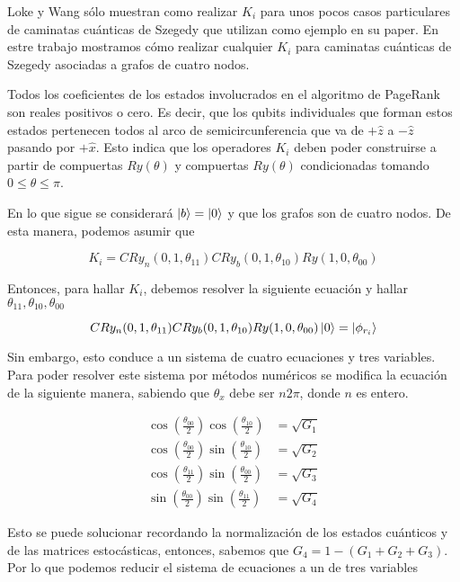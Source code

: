 Loke y Wang sólo muestran como realizar $K_i$ para unos pocos casos particulares de caminatas cuánticas de Szegedy que utilizan como ejemplo en su paper. En estre trabajo mostramos cómo realizar cualquier $K_i$ para caminatas cuánticas de Szegedy asociadas a grafos de cuatro nodos.

Todos los coeficientes de los estados involucrados en el algoritmo de PageRank son reales positivos o cero. Es decir, que los qubits individuales que forman estos estados pertenecen todos al arco de semicircunferencia que va de $+\hat{z}$ a $-\hat{z}$ pasando por $+\hat{x}$. Esto indica que los operadores $K_i$ deben poder construirse a partir de compuertas $Ry(\theta)$ y compuertas $Ry(\theta)$ condicionadas tomando $0 \leq \theta \leq \pi$.

En lo que sigue se considerará $\ket{b} = \ket{0}$ y que los grafos son de cuatro nodos. De esta manera, podemos asumir que

\begin{equation}
    K_i = CRy_n(0,1,\theta_{11}) CRy_b(0,1,\theta_{10}) Ry(1,0,\theta_{00})
\end{equation}

Entonces, para hallar $K_i$, debemos resolver la siguiente ecuación y hallar $\theta_{11}, \theta_{10}, \theta_{00}$

\begin{equation}
    CRy_n(0,1,\theta_{11}) CRy_b(0,1,\theta_{10}) Ry(1,0,\theta_{00}) \ket{0} = \ket{\phi_{r_i}}
\end{equation}

Sin embargo, esto conduce a un sistema de cuatro ecuaciones y tres variables. Para poder resolver este sistema por métodos numéricos se modifica la ecuación de la siguiente manera, sabiendo que $\theta_x$ debe ser $n 2\pi$, donde $n$ es entero.

\begin{align}
    \cos(\frac{\theta_{00}}{2}) \cos(\frac{\theta_{10}}{2}) &= \sqrt{G_1} \\
    \cos(\frac{\theta_{00}}{2}) \sin(\frac{\theta_{10}}{2}) &= \sqrt{G_2} \\
    \cos(\frac{\theta_{11}}{2}) \sin(\frac{\theta_{00}}{2}) &= \sqrt{G_3} \\
    \sin(\frac{\theta_{00}}{2}) \sin(\frac{\theta_{11}}{2}) &= \sqrt{G_4}
\end{align}

Esto se puede solucionar recordando la normalización de los estados cuánticos y de las matrices estocásticas, entonces, sabemos que $G_4 = 1 - (G_1 + G_2 + G_3)$. Por lo que podemos reducir el sistema de ecuaciones a un de tres variables

